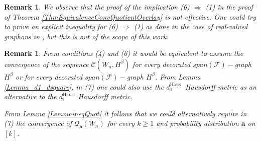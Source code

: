 \documentclass[11pt]{article}
\newtheorem{remark}[theorem]{Remark}
\newcommand{\cF}{{\mathcal F}}  %
\begin{document}
\begin{remark}
We observe that the proof of the implication (6) $\Rightarrow$ (1) in the proof of Theorem \ref{ThmEquivalenceConvQuotientOverlay} is not effective.
One could try to prove an explicit inequality for (6) $\Rightarrow$ (1) as done in the case of real-valued graphons in \cite{borgs2011convergentAnnals}, but this is out of the scope of this work.
\end{remark}

\begin{remark}\label{RemarkMainThmMorGen}
   From conditions (4) and (6) it would be equivalent to assume the convergence of the sequence $\mathcal{C}\left(W_n, H^{\beta}\right)$ for every decorated $span(\cF)-$graph $H^{\beta}$ or for every decorated $\overline{span(\cF)}-$graph $H^{\beta}$.
From Lemma \ref{Lemma_d1_dsquare}, in (7) one could also use the $d_1^{\text {Haus }}$ Hausdorff metric as an alternative to the  $d_{\square}^{\text {Haus }}$ Hausdorff metric.    
    
From Lemma \ref{LemmaineqQuot} it follows that we could alternatively require in (7) the convergence of $\mathcal{Q}_{\mathbf{a}}\left(W_n\right)$ for every $k \geq 1$ and probability distribution $\mathbf{a}$ on $[k]$. 
 

\end{remark}
\end{document}
